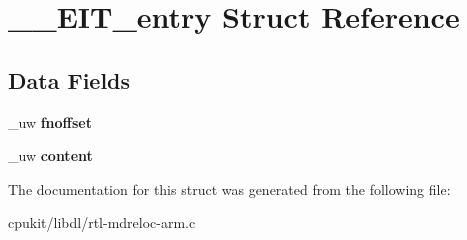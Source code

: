 \hypertarget{struct____EIT__entry}{}\section{\+\_\+\+\_\+\+E\+I\+T\+\_\+entry Struct Reference}
\label{struct____EIT__entry}
\subsection*{Data Fields}
\begin{DoxyCompactItemize}
\item 
\mbox{\label{struct____EIT__entry_a436dd33ef2d58c3dd6698ac561c826ef}} 
\+\_\+uw {\bfseries fnoffset}
\item 
\mbox{\label{struct____EIT__entry_a811ff4f9ecba45e28daa5e3392f99c74}} 
\+\_\+uw {\bfseries content}
\end{DoxyCompactItemize}


The documentation for this struct was generated from the following file\+:\begin{DoxyCompactItemize}
\item 
cpukit/libdl/rtl-\/mdreloc-\/arm.\+c\end{DoxyCompactItemize}
